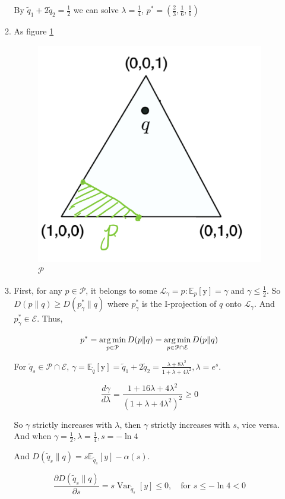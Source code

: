 \documentclass[a4paper]{article}
\begin{document}
\begin{enumerate}
\begin{enumerate}
  By $\tilde{q}_1 + 2 \tilde{q}_2 = \frac{1}{2}$ we can solve $\lambda = \frac{1}{4}$, $p^* = (\frac{2}{3},\frac{1}{6},\frac{1}{6})$ 

  \item As figure \ref{fig:3-5}
  \begin{figure}[!htbp]
    \centering
    \includegraphics[width = 0.3\linewidth]{3-5.jpg}
    \caption{$\mathcal{P}$}
    \label{fig:3-5}
  \end{figure}

  \item First, for any $p \in \mathcal{P}$, it belongs to some $\mathcal{L}_{\gamma} = {p: \mathbb{E}_p[\mathrm{y}]= \gamma}$ and $\gamma \leqslant \frac{1}{2}$. So $D(p\|q) \geqslant D(p_{\gamma}^* \| q)$ where $p_{\gamma}^*$ is the I-projection of $q$ onto $\mathcal{L}_{\gamma}$. And $p_{\gamma}^* \in \mathcal{E}$. Thus,
  
  \begin{equation}
    p^* = \operatorname*{arg\,min}_{p\in \mathcal{P}} D(p\| q) = \operatorname*{arg\,min}_{p\in \mathcal{P} \cap \mathcal{E}} D(p\| q)
  \end{equation}
  
  For $\tilde{q}_s \in {\mathcal{P} \cap \mathcal{E}}$, $\gamma = \mathbb{E}_{\tilde{q}}[\mathrm{y}] = \tilde{q}_1 + 2 \tilde{q}_2 = \frac{\lambda+8\lambda^2}{1+\lambda+4\lambda^2}, \lambda = e^s$.

  \begin{equation}
    \frac{d\gamma}{d\lambda} = \frac{1+16\lambda+4\lambda^2}{(1+\lambda+4\lambda^2)^2} \geqslant 0
  \end{equation}

  So $\gamma$ strictly increases with $\lambda$, then $\gamma$ strictly increases with $s$, vice versa. And when $\gamma = \frac{1}{2}, \lambda = \frac{1}{4}, s = -\ln 4$

  And $D(\tilde{q}_s \| q) = s \mathbb{E}_{\tilde{q}_s} [ y] - \alpha(s)$.

  \begin{equation}
    \frac{\partial D(\tilde{q}_s \| q)}{\partial s} = s \operatorname{Var}_{\tilde{q}_s} [y] \leqslant 0,\quad \text{for }  s\leqslant -\ln 4 <0
  \end{equation}


\end{enumerate}
\end{enumerate}
\end{document}
